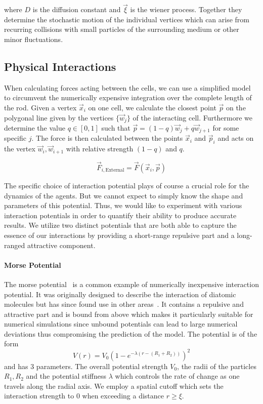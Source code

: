 \documentclass{article}
\begin{document}
where $D$ is the diffusion constant and $\vec{\xi}$ is the wiener process.
Together they determine the stochastic motion of the individual vertices which can arise from
recurring collisions with small particles of the surrounding medium or other minor fluctuations.

\subsection{Physical Interactions}
\label{subsection:mechanical-model-interactions}

When calculating forces acting between the cells, we can use a simplified model to circumvent the
numerically expensive integration over the complete length of the rod.
Given a vertex $\vec{x}_i$ on one cell, we calculate the closest point $\vec{p}$ on the polygonal
line given by the vertices $\{\vec{w}_j\}$ of the interacting cell.
Furthermore we determine the value $q\in[0,1]$ such that $\vec{p} = (1-q)\vec{w}_j + q\vec{w}_{j+1}$
for some specific $j$.
The force is then calculated between the points $\vec{x}_i$ and $\vec{p}_i$ and acts on
the vertex $\vec{w}_i,\vec{w}_{i+1}$ with relative strength $(1-q)$ and $q$.

\begin{equation}
    \vec{F}_{i,\text{External}} = \vec{F}(\vec{x}_i,\vec{p})
    \label{eq:cell-force-external}
\end{equation}

The specific choice of interaction potential plays of course a crucial role for the dynamics of the
agents.
But we cannot expect to simply know the shape and parameters of this potential.
Thus, we would like to experiment with various interaction potentials in order to quantify their
ability to produce accurate results.
We utilize two distinct potentials that are both able to capture the essence of our interactions by
providing a short-range repulsive part and a long-ranged attractive component.

\paragraph{Morse Potential}
The morse potential~\cite{Morse1929} is a common example of numerically inexpensive interaction
potential.
It was originally designed to describe the interaction of diatomic molecules but has since found use
in other areas~\cite{Breitwieser2021}.
It contains a repulsive and attractive part and is bound from above which makes it particularly
suitable for numerical simulations since unbound potentials can lead to large numerical deviations
thus compromising the prediction of the model.
The potential is of the form
\begin{equation}
    V(r) = V_0\left(1-e^{-\lambda(r-(R_1+R_2))}\right)^2
\end{equation}
and has 3 parameters.
The overall potential strength $V_0$, the radii of the particles $R_1,R_2$ and the potential
stiffness $\lambda$ which controls the rate of change as one travels along the radial axis.
We employ a spatial cutoff which sets the interaction strength to $0$ when exceeding a distance
$r\geq\xi$.
\end{document}
